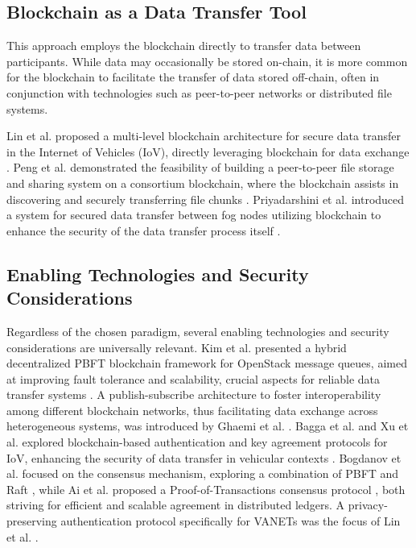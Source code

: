 \documentclass[10pt]{llncs}
\begin{document}
\subsection{Blockchain as a Data Transfer Tool}

This approach employs the blockchain directly to transfer data between participants.
While data may occasionally be stored on-chain, it is more common for the blockchain to facilitate the transfer of data stored off-chain,
 often in conjunction with technologies such as peer-to-peer networks or distributed file systems.

Lin et al. proposed a multi-level blockchain architecture for secure data transfer in the Internet of Vehicles (IoV), 
directly leveraging blockchain for data exchange \cite{Lin2023}. 
Peng et al. demonstrated the feasibility of building a peer-to-peer file storage and sharing system on a consortium blockchain, 
where the blockchain assists in discovering and securely transferring file chunks \cite{Peng2023}. 
Priyadarshini et al. introduced a system for secured data transfer between fog nodes utilizing blockchain to enhance the security of 
the data transfer process itself \cite{Priyadarshini2021}.

\subsection{Enabling Technologies and Security Considerations}

Regardless of the chosen paradigm, several enabling technologies and security considerations are universally relevant. 
Kim et al. presented a hybrid decentralized PBFT blockchain framework for OpenStack message queues, aimed at improving fault tolerance and scalability, 
crucial aspects for reliable data transfer systems \cite{kim2020hybrid}. 
A publish-subscribe architecture to foster interoperability among different blockchain networks, thus facilitating data exchange across heterogeneous systems, was introduced by Ghaemi et al. \cite{Ghaemi2021}. 
Bagga et al. and Xu et al. explored blockchain-based authentication and key agreement protocols for IoV, enhancing the security of data transfer in vehicular contexts \cite{Bagga2021,Xu2021}. 
Bogdanov et al. focused on the consensus mechanism, exploring a combination of PBFT and Raft \cite{Bogdanov2024}, while Ai et al. proposed a Proof-of-Transactions consensus protocol \cite{Ai2022}, 
both striving for efficient and scalable agreement in distributed ledgers. 
A privacy-preserving authentication protocol specifically for VANETs was the focus of Lin et al. \cite{Lin2020}. 
\end{document}
